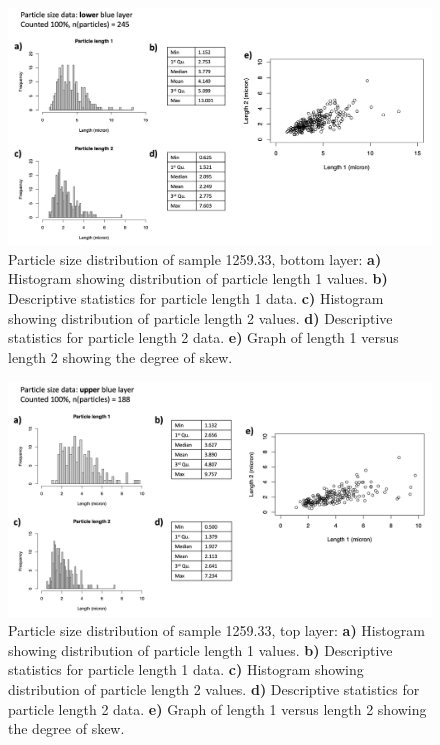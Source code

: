 \begin{figure}[H]
\centering
  \includegraphics[width=0.8\linewidth]{1259.33_partsize_1}
\caption[Particle size distribution, sample 1259.33, bottom layer.]{Particle size distribution of sample 1259.33, bottom layer: \textbf{a)} Histogram showing distribution of particle length 1 values. \textbf{b)} Descriptive statistics for particle length 1 data. \textbf{c)} Histogram showing distribution of particle length 2 values. \textbf{d)} Descriptive statistics for particle length 2 data. \textbf{e)} Graph of length 1 versus length 2 showing the degree of skew.}
\label{fig:1259.33_partsize_1}
\end{figure}

\begin{figure}[H]
\centering
  \includegraphics[width=0.8\linewidth]{1259.33_partsize_2}
\caption[Particle size distribution, sample 1259.33, top layer.]{Particle size distribution of sample 1259.33, top layer: \textbf{a)} Histogram showing distribution of particle length 1 values. \textbf{b)} Descriptive statistics for particle length 1 data. \textbf{c)} Histogram showing distribution of particle length 2 values. \textbf{d)} Descriptive statistics for particle length 2 data. \textbf{e)} Graph of length 1 versus length 2 showing the degree of skew.}
\label{fig:1259.33_partsize_2}
\end{figure}


